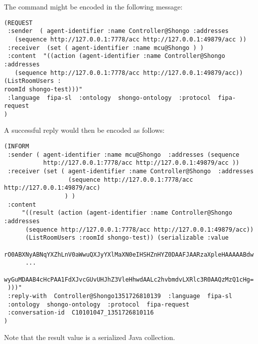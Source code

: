 The command might be encoded in the following message:
\begin{verbatim}
(REQUEST
 :sender  ( agent-identifier :name Controller@Shongo :addresses
   (sequence http://127.0.0.1:7778/acc http://127.0.0.1:49879/acc ))
 :receiver  (set ( agent-identifier :name mcu@Shongo ) )
 :content  "((action (agent-identifier :name Controller@Shongo :addresses
   (sequence http://127.0.0.1:7778/acc http://127.0.0.1:49879/acc)) (ListRoomUsers :
roomId shongo-test)))"
 :language  fipa-sl  :ontology  shongo-ontology  :protocol  fipa-request
)
\end{verbatim}

A successful reply would then be encoded as follows:
\begin{verbatim}
(INFORM
 :sender ( agent-identifier :name mcu@Shongo  :addresses (sequence
           http://127.0.0.1:7778/acc http://127.0.0.1:49879/acc ))
 :receiver (set ( agent-identifier :name Controller@Shongo  :addresses
                  (sequence http://127.0.0.1:7778/acc http://127.0.0.1:49879/acc)
                 ) )
 :content
     "((result (action (agent-identifier :name Controller@Shongo :addresses
      (sequence http://127.0.0.1:7778/acc http://127.0.0.1:49879/acc))
      (ListRoomUsers :roomId shongo-test)) (serializable :value
      rO0ABXNyABNqYXZhLnV0aWwuQXJyYXlMaXN0eIHSHZnHYZ0DAAFJAARzaXpleHAAAAABdw
      ...
      wyGuMDAAB4cHcPAA1FdXJvcGUvUHJhZ3VleHhwdAALc2hvbmdvLXRlc3R0AAQzMzQ1cHg=
 )))"
 :reply-with  Controller@Shongo1351726810139  :language  fipa-sl
 :ontology  shongo-ontology  :protocol  fipa-request
 :conversation-id  C10101047_1351726810116
)
\end{verbatim}
Note that the result value is a serialized Java collection.
